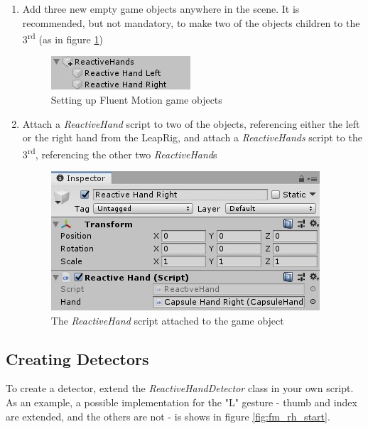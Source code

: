 \documentclass[12pt,a4paper,twoside]{report}
\begin{document}
\begin{enumerate}
  \item Add three new empty game objects anywhere in the scene. It is recommended, but not mandatory, to make two of the objects children to the 3\textsuperscript{rd} (as in figure \ref{fig:fm_setup}) \\
  \begin{figure}[H]
    \centering
    \includegraphics[width=0.9\linewidth]{img/FluentMotion_setup.jpg}
    \caption{Setting up Fluent Motion game objects}
    \label{fig:fm_setup}
  \end{figure}

  \item Attach a \textit{ReactiveHand} script to two of the objects, referencing either the left or the right hand from the LeapRig, and attach a \textit{ReactiveHands} script to the 3\textsuperscript{rd}, referencing the other two \textit{ReactiveHand}s \\
  \begin{figure}[h]
    \centering
    \includegraphics[width=0.9\linewidth]{img/FluentMotion_reactive_hand.jpg}
    \caption{The \textit{ReactiveHand} script attached to the game object}
    \label{fig:fm_rh_attached}
  \end{figure}
\end{enumerate}

\subsection{Creating Detectors}

To create a detector, extend the \textit{ReactiveHandDetector} class in your own script. As an example, a possible implementation for the "L" gesture - thumb and index are extended, and the others are not - is shows in figure \ref{fig:fm_rh_start}.
\end{document}
